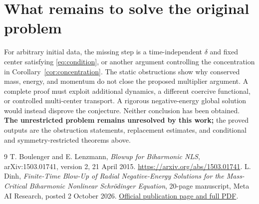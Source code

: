 \documentclass[11pt,a4paper]{article}
\theoremstyle{remark}\newtheorem{remark}[theorem]{Remark}
\begin{document}
\section{What remains to solve the original problem}
For arbitrary initial data, the missing step is a time-independent $\delta$ and fixed center satisfying \eqref{eq:condition}, or another argument controlling the concentration in Corollary~\ref{cor:concentration}. The static obstructions show why conserved mass, energy, and momentum do not close the proposed multiplier argument. A complete proof must exploit additional dynamics, a different coercive functional, or controlled multi-center transport. A rigorous negative-energy global solution would instead disprove the conjecture. Neither conclusion has been obtained. \textbf{The unrestricted problem remains unresolved by this work;} the proved outputs are the obstruction statements, replacement estimates, and conditional and symmetry-restricted theorems above.

\begin{thebibliography}{9}
 T. Boulenger and E. Lenzmann, \emph{Blowup for Biharmonic NLS}, arXiv:1503.01741, version 2, 21 April 2015. \url{https://arxiv.org/abs/1503.01741}.
 L. Dinh, \emph{Finite-Time Blow-Up of Radial Negative-Energy Solutions for the Mass-Critical Biharmonic Nonlinear Schr\"odinger Equation}, 20-page manuscript, Meta AI Research, posted 2 October 2026. \href{https://ai.meta.com/research/publications/finite-time-blow-up-of-radial-negative-energy-solutions-for-the-mass-critical-biharmonic-nonlinear-schrodinger-equation/}{Official publication page and full PDF}.
\end{thebibliography}
\end{document}
